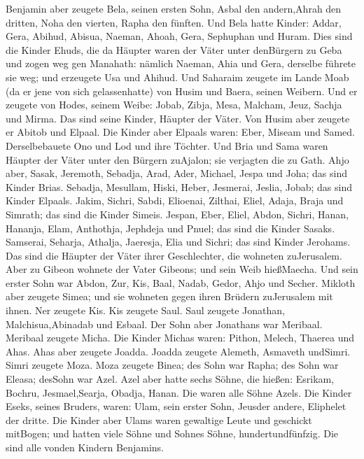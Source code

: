  Benjamin aber zeugete Bela, seinen ersten Sohn, Asbal den
andern,Ahrah den dritten,  Noha den vierten, Rapha den
fünften.  Und Bela hatte Kinder: Addar, Gera, Abihud,
 Abisua, Naeman, Ahoah,  Gera, Sephuphan und
Huram.  Dies sind die Kinder Ehuds, die da Häupter waren der
Väter unter denBürgern zu Geba und zogen weg gen Manahath: 
nämlich Naeman, Ahia und Gera, derselbe führete sie weg; und erzeugete
Usa und Ahihud.  Und Saharaim zeugete im Lande Moab (da er
jene von sich gelassenhatte) von Husim und Baera, seinen Weibern.
 Und er zeugete von Hodes, seinem Weibe: Jobab, Zibja, Mesa,
Malcham,  Jeuz, Sachja und Mirma. Das sind seine Kinder,
Häupter der Väter.  Von Husim aber zeugete er Abitob und
Elpaal.  Die Kinder aber Elpaals waren: Eber, Miseam und
Samed. Derselbebauete Ono und Lod und ihre Töchter.  Und
Bria und Sama waren Häupter der Väter unter den Bürgern zuAjalon; sie
verjagten die zu Gath.  Ahjo aber, Sasak, Jeremoth,
 Sebadja, Arad, Ader,  Michael, Jespa und
Joha; das sind Kinder Brias.  Sebadja, Mesullam, Hiski,
Heber,  Jesmerai, Jeslia, Jobab; das sind Kinder Elpaals.
 Jakim, Sichri, Sabdi,  Elioenai, Zilthai,
Eliel,  Adaja, Braja und Simrath; das sind die Kinder
Simeis.  Jespan, Eber, Eliel,  Abdon, Sichri,
Hanan,  Hananja, Elam, Anthothja,  Jephdeja
und Pnuel; das sind die Kinder Sasaks.  Samserai, Seharja,
Athalja,  Jaeresja, Elia und Sichri; das sind Kinder
Jerohams.  Das sind die Häupter der Väter ihrer
Geschlechter, die wohneten zuJerusalem.  Aber zu Gibeon
wohnete der Vater Gibeons; und sein Weib hießMaecha.  Und
sein erster Sohn war Abdon, Zur, Kis, Baal, Nadab,  Gedor,
Ahjo und Secher.  Mikloth aber zeugete Simea; und sie
wohneten gegen ihren Brüdern zuJerusalem mit ihnen.  Ner
zeugete Kis. Kis zeugete Saul. Saul zeugete Jonathan, Malchisua,Abinadab
und Esbaal.  Der Sohn aber Jonathans war Meribaal. Meribaal
zeugete Micha.  Die Kinder Michas waren: Pithon, Melech,
Thaerea und Ahas.  Ahas aber zeugete Joadda. Joadda zeugete
Alemeth, Asmaveth undSimri. Simri zeugete Moza.  Moza
zeugete Binea; des Sohn war Rapha; des Sohn war Eleasa; desSohn war
Azel.  Azel aber hatte sechs Söhne, die hießen: Esrikam,
Bochru, Jesmael,Searja, Obadja, Hanan. Die waren alle Söhne Azels.
 Die Kinder Eseks, seines Bruders, waren: Ulam, sein erster
Sohn, Jeusder andere, Eliphelet der dritte.  Die Kinder
aber Ulams waren gewaltige Leute und geschickt mitBogen; und hatten
viele Söhne und Sohnes Söhne, hundertundfünfzig. Die sind alle vonden
Kindern Benjamins.

